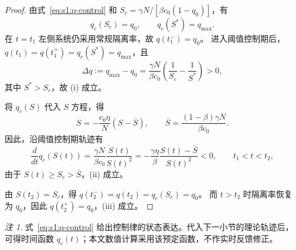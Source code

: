 \documentclass[UTF8,a4paper,10pt,fontset=fandol]{ctexart}
\theoremstyle{cnplain}
\theoremstyle{remark}
\newtheorem*{remark}{注}
\numberwithin{equation}{section}
\begin{document}
\begin{proof}
由式~\eqref{eq:s1:q-control} 和 $S_c=\gamma N/[\beta c_0(1-q_0)]$，有
\[
q_c(S_c)=q_0,\qquad q_c(S^*)=q_{\max}.
\]
在 $t=t_1$ 左侧系统仍采用常规隔离率，故 $q(t_1^-)=q_0$。
进入阈值控制期后，$q(t_1)=q(t_1^+)=q_c(S^*)=q_{\max}$，且
\[
\Delta q:=q_{\max}-q_0
=\frac{\gamma N}{\beta c_0}
\left(\frac{1}{S_c}-\frac{1}{S^*}\right)>0,
\]
其中 $S^*>S_c$，故 (i) 成立。

将 $q_c(S)$ 代入 $S$ 方程，得
\[
\dot S=-\frac{c_0\eta}{N}(S-\bar S),\qquad
\bar S=\frac{(1-\beta)\gamma N}{\beta c_0}.
\]
因此，沿阈值控制期轨迹有
\[
\frac{d}{dt}q_c(S(t))
=\frac{\gamma N}{\beta c_0}\frac{\dot S(t)}{S(t)^2}
=-\frac{\gamma\eta}{\beta}\frac{S(t)-\bar S}{S(t)^2}<0,
\qquad t_1<t<t_2,
\]
由于 $S(t)\ge S_c>\bar S$，(ii) 成立。

由 $S(t_2)=S_c$，得 $q(t_2^-)=q(t_2)=q_c(S_c)=q_0$。
而 $t>t_2$ 时隔离率恢复为 $q_0$，因此 $q(t_2^+)=q_0$，(iii) 成立。
\end{proof}

\begin{remark}
式~\eqref{eq:s1:q-control} 给出控制律的状态表达。代入下一小节的理论轨迹后，可得时间函数 $q_c(t)$；本文数值计算采用该预定函数，不作实时反馈修正。
\end{remark}
\end{document}
